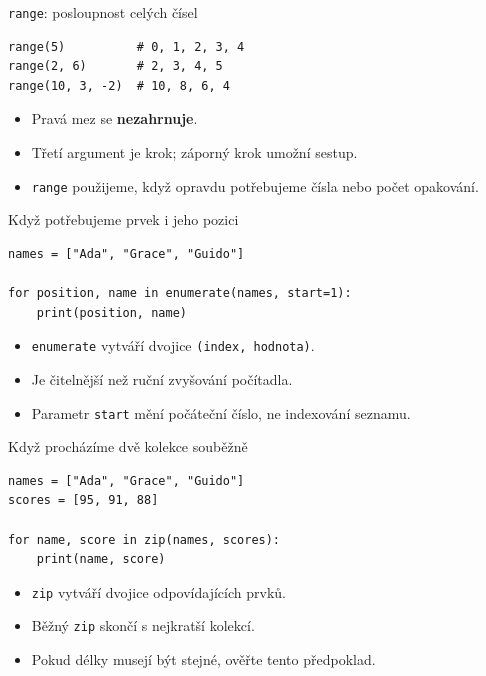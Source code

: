 \documentclass[aspectratio=169,t]{beamer}
\begin{document}
\begin{frame}[fragile]{\texttt{range}: posloupnost celých čísel}
\begin{lstlisting}[style=python]
range(5)          # 0, 1, 2, 3, 4
range(2, 6)       # 2, 3, 4, 5
range(10, 3, -2)  # 10, 8, 6, 4
\end{lstlisting}
  \begin{itemize}
    \item Pravá mez se \textbf{nezahrnuje}.
    \item Třetí argument je krok; záporný krok umožní sestup.
    \item \texttt{range} použijeme, když opravdu potřebujeme čísla nebo počet opakování.
  \end{itemize}
\end{frame}

\begin{frame}[fragile]{Když potřebujeme prvek i jeho pozici}
\begin{lstlisting}[style=python]
names = ["Ada", "Grace", "Guido"]

for position, name in enumerate(names, start=1):
    print(position, name)
\end{lstlisting}
  \begin{itemize}
    \item \texttt{enumerate} vytváří dvojice \texttt{(index, hodnota)}.
    \item Je čitelnější než ruční zvyšování počítadla.
    \item Parametr \texttt{start} mění počáteční číslo, ne indexování seznamu.
  \end{itemize}
\end{frame}

\begin{frame}[fragile]{Když procházíme dvě kolekce souběžně}
\begin{lstlisting}[style=python]
names = ["Ada", "Grace", "Guido"]
scores = [95, 91, 88]

for name, score in zip(names, scores):
    print(name, score)
\end{lstlisting}
  \begin{itemize}
    \item \texttt{zip} vytváří dvojice odpovídajících prvků.
    \item Běžný \texttt{zip} skončí s nejkratší kolekcí.
    \item Pokud délky musejí být stejné, ověřte tento předpoklad.
  \end{itemize}
\end{frame}
\end{document}
